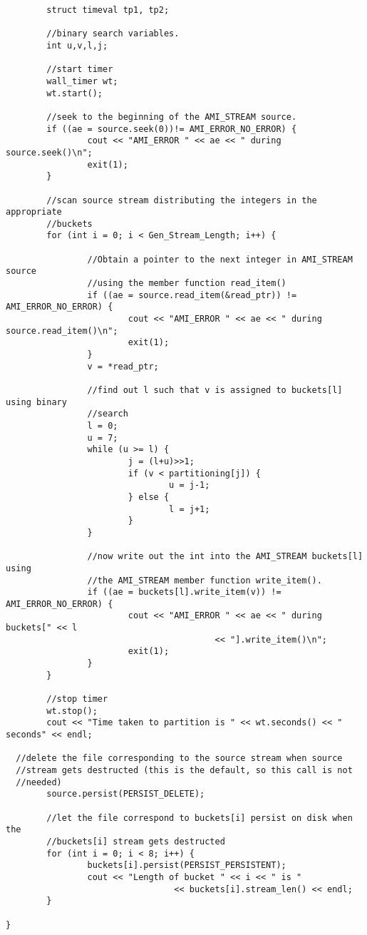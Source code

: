 \begin{verbatim}
        struct timeval tp1, tp2;

        //binary search variables.
        int u,v,l,j;
        
        //start timer
        wall_timer wt;
        wt.start();
        
        //seek to the beginning of the AMI_STREAM source.
        if ((ae = source.seek(0))!= AMI_ERROR_NO_ERROR) {
                cout << "AMI_ERROR " << ae << " during source.seek()\n";
                exit(1);
        }
        
        //scan source stream distributing the integers in the appropriate
        //buckets
        for (int i = 0; i < Gen_Stream_Length; i++) {
                
                //Obtain a pointer to the next integer in AMI_STREAM source
                //using the member function read_item()
                if ((ae = source.read_item(&read_ptr)) != AMI_ERROR_NO_ERROR) {
                        cout << "AMI_ERROR " << ae << " during source.read_item()\n";
                        exit(1);
                }
                v = *read_ptr;

                //find out l such that v is assigned to buckets[l] using binary
                //search
                l = 0;
                u = 7;
                while (u >= l) {
                        j = (l+u)>>1; 
                        if (v < partitioning[j]) {
                                u = j-1;
                        } else {
                                l = j+1;
                        }
                }

                //now write out the int into the AMI_STREAM buckets[l] using 
                //the AMI_STREAM member function write_item().
                if ((ae = buckets[l].write_item(v)) != AMI_ERROR_NO_ERROR) {
                        cout << "AMI_ERROR " << ae << " during buckets[" << l 
                                         << "].write_item()\n";
                        exit(1);
                }
        }
        
        //stop timer
        wt.stop();
        cout << "Time taken to partition is " << wt.seconds() << " seconds" << endl;
        
  //delete the file corresponding to the source stream when source
  //stream gets destructed (this is the default, so this call is not
  //needed)
        source.persist(PERSIST_DELETE);
        
        //let the file correspond to buckets[i] persist on disk when the
        //buckets[i] stream gets destructed
        for (int i = 0; i < 8; i++) {
                buckets[i].persist(PERSIST_PERSISTENT);
                cout << "Length of bucket " << i << " is " 
                                 << buckets[i].stream_len() << endl;
        }
        
}

\end{verbatim}

